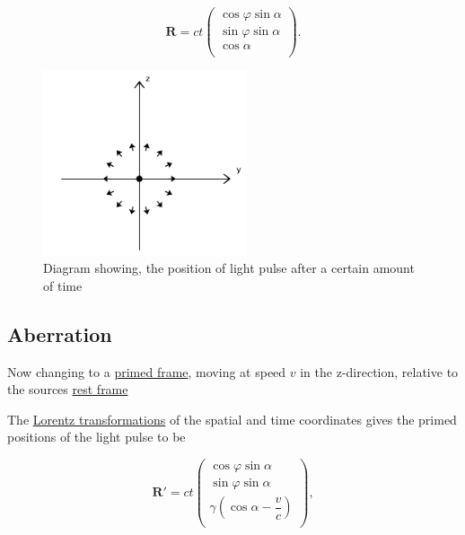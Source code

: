 \begin{equation}
	\label{displacement: proper pulse}
	\mathbf{R} =  c t
	\begin{pmatrix}
		\cos{\varphi}\sin{\alpha} \\
		\sin{\varphi}\sin{\alpha} \\
		\cos{\alpha}              \\
	\end{pmatrix}.
\end{equation}

\begin{figure}[ht]
	\centering
	\includegraphics[width=6cm]{images/pdf/Rest_Pulse.pdf}
	\caption{Diagram showing, the position of light pulse after a certain amount of time}
	\label{fig: Rest Pulse}
\end{figure}

\subsection{Aberration}

Now changing to a \hyperlink{def-Primed-Frame}{primed frame}, moving at speed $v$ in the z-direction, relative to the sources \hyperlink{def-proper-frame}{rest frame}

The \hyperlink{def-lorentz-transform}{Lorentz transformations} of the spatial and time coordinates gives the primed positions of the light pulse to be

\begin{equation}
	\label{displacement: primed pulse}
	\mathbf{R'} = c t
	\begin{pmatrix}
		\cos{\varphi}\sin{\alpha}                      \\
		\sin{\varphi}\sin{\alpha}                      \\
		\gamma\left(\cos{\alpha} - \dfrac{v}{c}\right) \\
	\end{pmatrix},
\end{equation}

